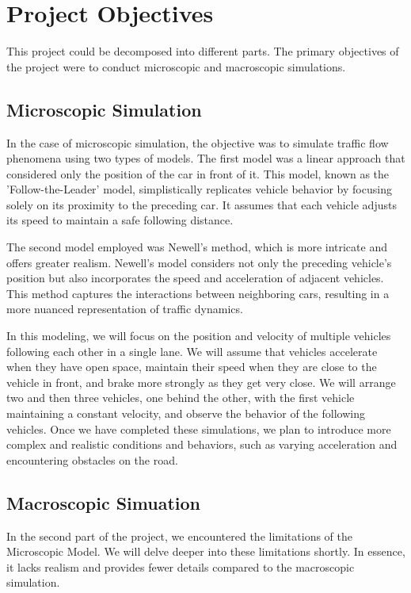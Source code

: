 \documentclass{article}
\begin{document}
	\section{Project Objectives}
	
	This project could be decomposed into different parts. The primary objectives of the project were to conduct microscopic and macroscopic simulations.
	
	\subsection{Microscopic Simulation}
	
	
	In the case of microscopic simulation, the objective was to simulate traffic flow phenomena using two types of models.
	The first model was a linear approach that considered only the position of the car in front of it. This model, known as the 'Follow-the-Leader' model, simplistically replicates vehicle behavior by focusing solely on its proximity to the preceding car. It assumes that each vehicle adjusts its speed to maintain a safe following distance.
	
	The second model employed was Newell's method, which is more intricate and offers greater realism. Newell's model considers not only the preceding vehicle's position but also incorporates the speed and acceleration of adjacent vehicles. This method captures the interactions between neighboring cars, resulting in a more nuanced representation of traffic dynamics.
	
	In this modeling, we will focus on the position and velocity of multiple vehicles following each other in a single lane. We will assume that vehicles accelerate when they have open space, maintain their speed when they are close to the vehicle in front, and brake more strongly as they get very close. We will arrange two and then three vehicles, one behind the other, with the first vehicle maintaining a constant velocity, and observe the behavior of the following vehicles.
	Once we have completed these simulations, we plan to introduce more complex and realistic conditions and behaviors, such as varying acceleration and encountering obstacles on the road.
	
	\subsection{Macroscopic Simuation}
	
	In the second part of the project, we encountered the limitations of the Microscopic Model. We will delve deeper into these limitations shortly. In essence, it lacks realism and provides fewer details compared to the macroscopic simulation.
	
\end{document}
